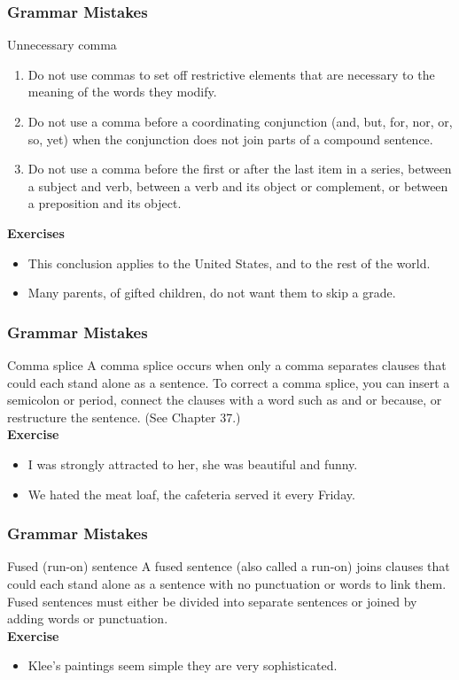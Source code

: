 \documentclass{beamer}
\begin{document}
\begin{frame}
\frametitle{Grammar Mistakes}
\begin{block}{Unnecessary comma}
\begin{enumerate}
\item Do not use commas to set off restrictive elements that are necessary to the meaning of the words they modify. 
\item Do not use a comma before a coordinating conjunction (and, but, for, nor, or, so, yet) when the conjunction does not join parts of a compound sentence. 
\item Do not use a comma before the first or after the last item in a series, between a subject and verb, between a verb and its object or complement, or between a preposition and its object.
\end{enumerate}
\textbf{Exercises}
\begin{itemize}
\item This conclusion applies to the United States, and to the rest of the world.
\item Many parents, of gifted children, do not want them to skip a grade.
\end{itemize}
\end{block}
\end{frame}
\begin{frame}
\frametitle{Grammar Mistakes}
\begin{block}{Comma splice}
A comma splice occurs when only a comma separates clauses that could each stand alone as a sentence. To correct a comma splice, you can insert a semicolon or period, connect the clauses with a word such as and or because, or restructure the sentence. (See Chapter 37.)\\
\textbf{Exercise}
\begin{itemize}
\item I was strongly attracted to her, she was beautiful and funny.
\item We hated the meat loaf, the cafeteria served it every Friday.

\end{itemize}
\end{block}
\end{frame}
\begin{frame}
\frametitle{Grammar Mistakes}
\begin{block}{Fused (run-on)	sentence}
A fused sentence (also called a run-on) joins clauses that could each stand alone as a sentence with no punctuation or words to link them. Fused sentences must either be divided into separate sentences or joined by adding words or punctuation.\\
\textbf{Exercise}
\begin{itemize}
\item  Klee's paintings seem simple they are very sophisticated.
\end{itemize}
\end{block}
\end{frame}
\end{document}
